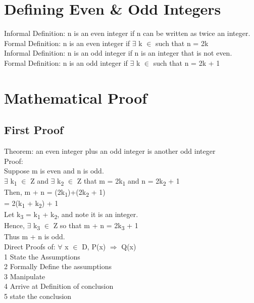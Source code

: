 \documentclass[11pt]{article}
\begin{document}
\section{Defining Even \& Odd Integers}
\label{sec:org10877d7}
Informal Definition: n is an even integer if n can be written as twice an integer.\\
Formal Definition: n is an even integer if \(\exists\) k \(\in\)  such that n = 2k\\

Informal Definition: n is an odd integer if n is an integer that is not even.\\
Formal Definition: n is an odd integer if \(\exists\) k \(\in\)  such that n = 2k + 1\\

\section{Mathematical Proof}
\label{sec:orgee23fc4}
\subsection{First Proof}
\label{sec:org932c026}
Theorem: an even integer plus an odd integer is another odd integer\\
Proof:\\
Suppose m is even and n is odd.\\
\(\exists\) k\textsubscript{1} \(\in\) Z and \(\exists\) k\textsubscript{2} \(\in\) Z that m = 2k\textsubscript{1} and n = 2k\textsubscript{2} + 1\\

Then, m + n = (2k\textsubscript{1})+(2k\textsubscript{2} + 1)\\
= 2(k\textsubscript{1} + k\textsubscript{2}) + 1\\
Let k\textsubscript{3} = k\textsubscript{1} + k\textsubscript{2}, and note it is an integer.\\

Hence, \(\exists\) k\textsubscript{3} \(\in\) Z so that m + n = 2k\textsubscript{3} + 1\\
Thus m + n is odd.\\

Direct Proofs of: \(\forall\) x \(\in\) D, P(x) \(\Rightarrow\) Q(x)\\
1 State the Assumptions\\
2 Formally Define the assumptions\\
3 Manipulate\\
4 Arrive at Definition of conclusion\\
5 state the conclusion\\
\end{document}
